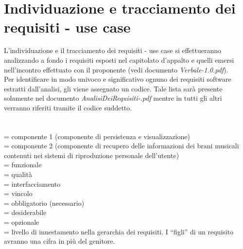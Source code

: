 \section{Individuazione e tracciamento dei requisiti - use case}
L'individuazione e il tracciamento dei requisiti - use case si effettueranno
analizzando a fondo i requisiti esposti nel capitolato d'appalto e quelli emersi nell'incontro effettuato con il proponente (vedi documento \emph{Verbale-1.0.pdf}).
\\
Per identificare in modo univoco e significativo ognuno dei requisiti software
estratti dall'analisi, gli viene assegnato un codice.
Tale lista sar\`a presente solamente nel documento
\emph{AnalisiDeiRequisiti-\versioneAR.pdf} mentre in tutti gli altri verranno
riferiti tramite il codice suddetto.
\\
\\
\\
 = componente 1 (componente di persistenza e visualizzazione)\\
 = componente 2 (componente di recupero delle informazioni dei brani
musicali contenuti nei sistemi di riproduzione personale dell'utente)\\
 = funzionale\\
 = qualit\`a\\
 = interfacciamento\\
 = vincolo\\
 = obbligatorio (necessario)\\
 = desiderabile\\
 = opzionale\\
 = livello di innestamento nella gerarchia dei requisiti. I ``figli'' di
un requisito avranno una cifra in pi\`u del genitore.

